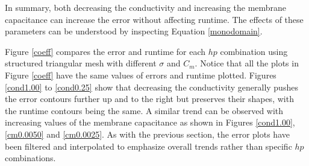 In summary, both decreasing the conductivity and increasing the membrane capacitance can increase the error without affecting runtime. The effects of these parameters can be understood by inspecting Equation \ref{monodomain}. 
\par
Figure \ref{coeff} compares the error and runtime for each $hp$ combination using structured triangular mesh with different $\sigma$ and $C_m$. Notice that all the plots in Figure \ref{coeff} have the same values of errors and runtime plotted. Figures \ref{cond1.00} to \ref{cond0.25} show that decreasing the conductivity generally pushes the error contours further up and to the right but preserves their shapes, with the runtime contours being the same. A similar trend can be observed with increasing values of the membrane capacitance as shown in Figures \ref{cond1.00}, \ref{cm0.0050} and \ref{cm0.0025}. As with the previous section, the error plots have been filtered and interpolated to emphasize overall trends rather than specific $hp$ combinations.

